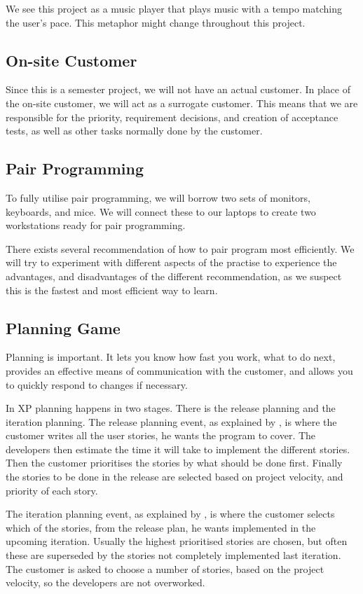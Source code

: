 We see this project as a music player that plays music with a tempo matching the user's pace.
This metaphor might change throughout this project.

\subsection{On-site Customer}
Since this is a semester project, we will not have an actual customer.
In place of the on-site customer, we will act as a surrogate customer.
This means that we are responsible for the priority, requirement decisions, and creation of acceptance tests, as well as other tasks normally done by the customer.

\subsection{Pair Programming}
\label{def:pairprogramming}
To fully utilise pair programming, we will borrow two sets of monitors, keyboards, and mice.
We will connect these to our laptops to create two workstations ready for pair programming.

There exists several recommendation of how to pair program most efficiently. 
We will try to experiment with different aspects of the practise to experience the advantages, and disadvantages of the different recommendation, as we suspect this is the fastest and most efficient way to learn.

\subsection{Planning Game}
Planning is important. It lets you know how fast you work, what to do next, provides an effective means of communication with the customer, and allows you to quickly respond to changes if necessary.

In XP planning happens in two stages. There is the release planning and the iteration planning.
The release planning event, as explained by \citet[p. 40]{xp:planning}, is where the customer writes all the user stories, he wants the program to cover.
The developers then estimate the time it will take to implement the different stories.
Then the customer prioritises the stories by what should be done first.
Finally the stories to be done in the release are selected based on project velocity, and priority of each story.

The iteration planning event, as explained by \citet[Iteration Planning]{xp:online}, is where the customer selects which of the stories, from the release plan, he wants implemented in the upcoming iteration.
Usually the highest prioritised stories are chosen, but often these are superseded by the stories not completely implemented last iteration.
The customer is asked to choose a number of stories, based on the project velocity, so the developers are not overworked.

